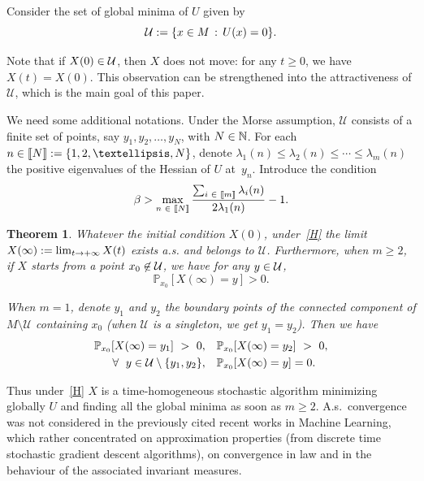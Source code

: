 \documentclass[10pt]{amsart}
\newtheorem{theo}{Theorem}[section]
\theoremstyle{definition}\newtheorem{defi}[theo]{Definition}\newtheorem{rema}[theo]{Remark}\newtheorem{exam}[theo]{Example}\newtheorem{exem}[theo]{Example}\newtheorem{nota}[theo]{Notation}
\newcommand{\f}[2]{\frac{#1}{#2}}
\newcommand{\cU}{\mathcal{U}}
\newcommand{\NN}{\mathbb{N}}
\newcommand{\PP}{\mathbb{P}}
\newcommand{\iy}{\infty}
\newcommand{\fo}{\forall\ }
\let\oldin\in
\renewcommand{\in}{\mathchoice{\oldin}{\oldin}{\,\oldin\,}{\,\oldin\,}}
\renewcommand*{\to}{\mathchoice{\longrightarrow}{\rightarrow}{\rightarrow}{\rightarrow}}
\let\oldforall\forall
\renewcommand*{\forall}{\mathrel{\oldforall}}
\newcommand{\llbracket}{\mathopen{[\mkern -2.7mu[}}
\newcommand{\rrbracket}{\mathclose{]\mkern -2.7mu]}}
\newcommand{\lin}{\llbracket}
\newcommand{\rin}{\rrbracket}
\begin{document}
Consider the set of global minima of $U$ given by
\begin{equation*}
\cU := \{x\in M\,:\, U(x)=0\}.
\end{equation*}


Note that if $X(0)\in\cU$, then $X$ does not move: for any $t\geq 0$, we have $X(t)=X(0)$. This observation can be strengthened into the attractiveness of $\cU$, which is the main goal of this paper.

We need some additional notations. Under the Morse assumption, $\cU$ consists of a finite set of points, say $y_1, y_2,\dots, y_N$, with $N\in\NN$. For each $n\in\lin N\rin:=\{1,2,\dots, N\}$, denote $\lambda_1(n)\leq \lambda_2(n)\leq \cdots \leq \lambda_m(n)$ the positive eigenvalues of the Hessian of $U$ at~$y_n$. Introduce the condition
\begin{equation}\label{H}
\beta > \max_{n\in\lin N\rin}\f{\sum_{i\in\lin m\rin}\lambda_i(n)}{2\lambda_1(n)}-1.
\end{equation}



\begin{theo}\label{theo1}
Whatever the initial condition $X(0)$, under~\eqref{H} the limit $X(\iy):=\lim_{t\to+\iy} X(t)$ exists a.s. and belongs to $\cU$. Furthermore, when $m\geq 2$, if $X$ starts from a point $x_0\not\in \cU$, we have for any $y\in \cU$,
\begin{equation*}
\PP_{x_0}[X(\iy)=y] > 0.
\end{equation*}


When $m=1$, denote $y_1$ and $y_2$ the boundary points of the connected component of $M\setminus\cU$ containing $x_0$ (when $\cU$ is a singleton, we get $y_1=y_2$). Then we have
\begin{align*}
 \PP_{x_0}[X(\iy)=y_1]\ >\ 0,\quad &\PP_{x_0}[X(\iy)=y_2]\ >\ 0, \\ 
\fo y\in\cU\setminus\{y_1,y_2\},\quad &\PP_{x_0}[X(\iy)=y]=0.
\end{align*}
\end{theo}


Thus under~\eqref{H} $X$ is a time-homogeneous stochastic algorithm minimizing global\-ly $U$ and finding all the global minima as soon as $m\geq 2$. A.s.\ convergence was not considered in the previously cited recent works in Machine Learning, which rather concentrated on approximation properties (from discrete time stochastic gradient descent algorithms), on convergence in law and in the behaviour of the associated invariant measures.
\end{document}
